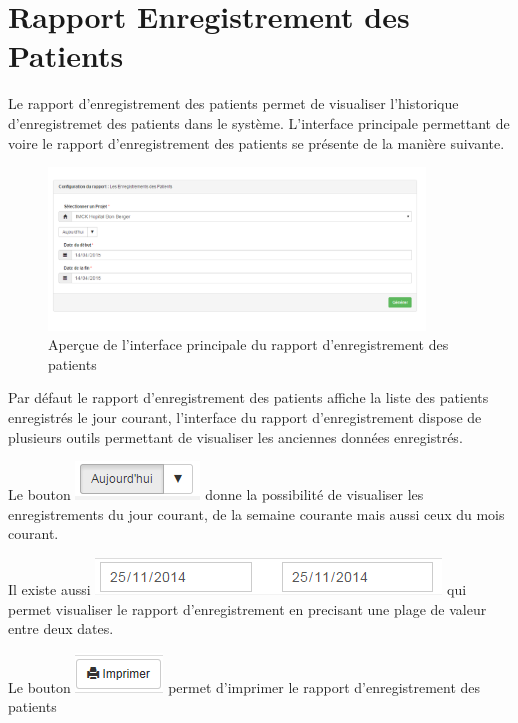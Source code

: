 \documentclass[12pt,a4paper]{report}
\begin{document}
\newpage
\section{Rapport Enregistrement des Patients}
Le rapport d'enregistrement des patients permet de visualiser l'historique d'enregistremet des patients dans le système. L'interface principale permettant de voire le rapport d'enregistrement des patients se présente de la manière suivante. 

\begin{figure}[h]
\begin{center}
\includegraphics[width=10cm]{pic/RapportEnrPatient.png}
\end{center}
\caption{Aperçue de l'interface principale du rapport d'enregistrement des patients}
\label{Aperçue de l'interface principale du rapport d'enregistrement des patients}
\end{figure}

Par défaut le rapport d'enregistrement des patients affiche la liste des patients enregistrés le jour courant, l'interface du rapport d'enregistrement dispose de plusieurs outils permettant de visualiser les anciennes données enregistrés.

Le bouton \includegraphics[scale=0.7]{pic/Todays.png} donne la possibilité de visualiser les enregistrements du jour courant, de la semaine courante mais aussi ceux du mois courant. 

Il existe aussi  \includegraphics[scale=0.7]{pic/PlageTimes.png} qui permet visualiser le rapport d'enregistrement en precisant une plage de valeur entre deux dates.

Le bouton \includegraphics[scale=0.7]{pic/Print.png} permet d'imprimer le rapport d'enregistrement des patients
\end{document}
